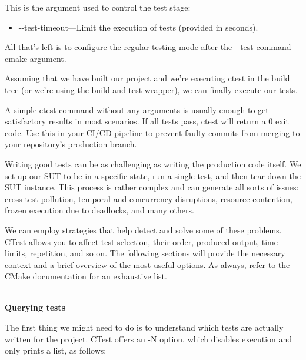 This is the argument used to control the test stage:

\begin{itemize}
\item 
-{}-test-timeout—Limit the execution of tests (provided in seconds).
\end{itemize}

All that's left is to configure the regular testing mode after the -{}-test-command cmake argument.


Assuming that we have built our project and we're executing ctest in the build tree (or we're using the build-and-test wrapper), we can finally execute our tests.

A simple ctest command without any arguments is usually enough to get satisfactory results in most scenarios. If all tests pass, ctest will return a 0 exit code. Use this in your CI/CD pipeline to prevent faulty commits from merging to your repository's production branch.

Writing good tests can be as challenging as writing the production code itself. We set up our SUT to be in a specific state, run a single test, and then tear down the SUT instance. This process is rather complex and can generate all sorts of issues: cross-test pollution, temporal and concurrency disruptions, resource contention, frozen execution due to deadlocks, and many others.

We can employ strategies that help detect and solve some of these problems. CTest allows you to affect test selection, their order, produced output, time limits, repetition, and so on. The following sections will provide the necessary context and a brief overview of the most useful options. As always, refer to the CMake documentation for an exhaustive list.

\hspace*{\fill} \\ %
\noindent
\textbf{Querying tests}

The first thing we might need to do is to understand which tests are actually written for the project. CTest offers an -N option, which disables execution and only prints a list, as follows:


